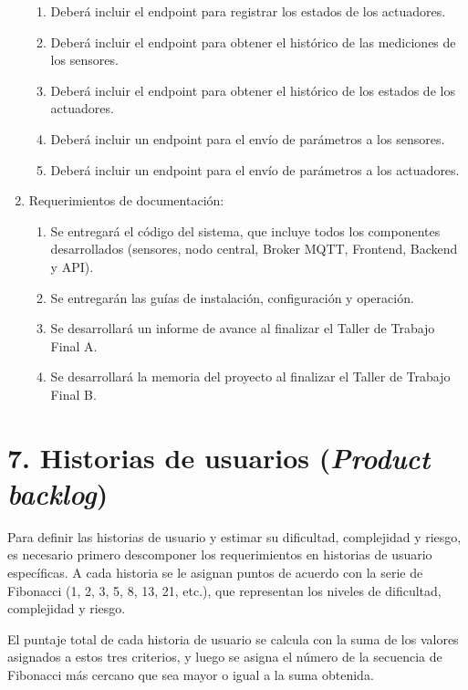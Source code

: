 \documentclass[
11pt, %
codirector, %
]{charter}
\begin{document}
\begin{enumerate}
\begin{enumerate}
		      \item Deberá incluir el endpoint para registrar los estados de los actuadores.
		      \item Deberá incluir el endpoint para obtener el histórico de las mediciones de los
		            sensores.
		      \item Deberá incluir el endpoint para obtener el histórico de los estados de los
		            actuadores.
		      \item Deberá incluir un endpoint para el envío de parámetros a los sensores.
		      \item Deberá incluir un endpoint para el envío de parámetros a los actuadores.

	      \end{enumerate}

	\item Requerimientos de documentación:
	      \begin{enumerate}
		      \item Se entregará el código del sistema, que incluye todos los componentes
		            desarrollados (sensores, nodo central, Broker MQTT, Frontend, Backend y API).
		      \item Se entregarán las guías de instalación, configuración y operación.
		      \item Se desarrollará un informe de avance al finalizar el Taller de Trabajo Final A.
		      \item Se desarrollará la memoria del proyecto al finalizar el Taller de Trabajo Final
		            B.
	      \end{enumerate}
\end{enumerate}

\section{7. Historias de usuarios (\textit{Product backlog})}
\label{sec:backlog}

Para definir las historias de usuario y estimar su dificultad, complejidad y
riesgo, es necesario primero descomponer los requerimientos en historias de
usuario específicas. A cada historia se le asignan puntos de acuerdo con la
serie de Fibonacci (1, 2, 3, 5, 8, 13, 21, etc.), que representan los niveles
de dificultad, complejidad y riesgo.

El puntaje total de cada historia de usuario se calcula con la suma de los
valores asignados a estos tres criterios, y luego se asigna el número de la
secuencia de Fibonacci más cercano que sea mayor o igual a la suma obtenida.
\end{document}
